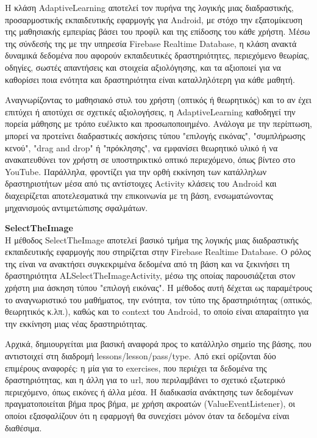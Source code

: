 \documentclass[11pt]{report}
\begin{document}
Η κλάση AdaptiveLearning αποτελεί τον πυρήνα της λογικής μιας διαδραστικής, προσαρμοστικής εκπαιδευτικής εφαρμογής για Android, με στόχο την εξατομίκευση της μαθησιακής εμπειρίας βάσει του προφίλ και της επίδοσης του κάθε χρήστη. Μέσω της σύνδεσής της με την υπηρεσία Firebase Realtime Database, η κλάση ανακτά δυναμικά δεδομένα που αφορούν εκπαιδευτικές δραστηριότητες, περιεχόμενο θεωρίας, οδηγίες, σωστές απαντήσεις και στοιχεία αξιολόγησης, και τα αξιοποιεί για να καθορίσει ποια ενότητα και δραστηριότητα είναι καταλληλότερη για κάθε μαθητή. 

Αναγνωρίζοντας το μαθησιακό στυλ του χρήστη (οπτικός ή θεωρητικός) και το αν έχει επιτύχει ή αποτύχει σε σχετικές αξιολογήσεις, η AdaptiveLearning καθοδηγεί την πορεία μάθησης με τρόπο ευέλικτο και προσωποποιημένο. Ανάλογα με την περίπτωση, μπορεί να προτείνει διαδραστικές ασκήσεις τύπου "επιλογής εικόνας", "συμπλήρωσης κενού", "drag and drop" ή "πρόκλησης", να εμφανίσει θεωρητικό υλικό ή να ανακατευθύνει τον χρήστη σε υποστηρικτικό οπτικό περιεχόμενο, όπως βίντεο στο YouTube. Παράλληλα, φροντίζει για την ορθή εκκίνηση των κατάλληλων δραστηριοτήτων μέσα από τις αντίστοιχες Activity κλάσεις του Android και διαχειρίζεται αποτελεσματικά την επικοινωνία με τη βάση, ενσωματώνοντας μηχανισμούς αντιμετώπισης σφαλμάτων. 

\vspace{0.3cm}
\textbf{SelectTheImage} \\

Η μέθοδος SelectTheImage αποτελεί βασικό τμήμα της λογικής μιας διαδραστικής εκπαιδευτικής εφαρμογής που στηρίζεται στην Firebase Realtime Database. Ο ρόλος της είναι να ανακτήσει συγκεκριμένα δεδομένα από τη βάση και να ξεκινήσει τη δραστηριότητα ALSelectTheImageActivity, μέσω της οποίας παρουσιάζεται στον χρήστη μια άσκηση τύπου "επιλογή εικόνας". Η μέθοδος αυτή δέχεται ως παραμέτρους το αναγνωριστικό του μαθήματος, την ενότητα, τον τύπο της δραστηριότητας (οπτικός, θεωρητικός κ.λπ.), καθώς και το context του Android, το οποίο είναι απαραίτητο για την εκκίνηση μιας νέας δραστηριότητας.  

Αρχικά, δημιουργείται μια βασική αναφορά προς το κατάλληλο σημείο της βάσης, που αντιστοιχεί στη διαδρομή lessons/lesson/pass/type. Από εκεί ορίζονται δύο επιμέρους αναφορές: η μία για το exercises, που περιέχει τα δεδομένα της δραστηριότητας, και η άλλη για το url, που περιλαμβάνει το σχετικό εξωτερικό περιεχόμενο, όπως εικόνες ή άλλα μέσα. Η διαδικασία ανάκτησης των δεδομένων πραγματοποιείται βήμα προς βήμα, με χρήση ακροατών (ValueEventListener), οι οποίοι εξασφαλίζουν ότι η εφαρμογή θα συνεχίσει μόνον όταν τα δεδομένα είναι διαθέσιμα.  
\end{document}
